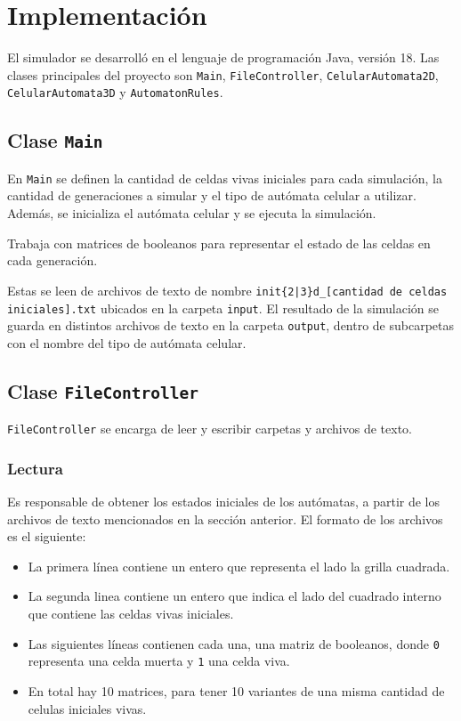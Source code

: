 \section{Implementación}
\label{sec:implementacion}

El simulador se desarrolló en el lenguaje de programación Java, versión 18.
Las clases principales del proyecto son \texttt{Main}, \texttt{FileController}, \texttt{CelularAutomata2D}, \texttt{CelularAutomata3D} y \texttt{AutomatonRules}.

\subsection{Clase \texttt{Main}}
\label{subsec:main}
En \texttt{Main} se definen la cantidad de celdas vivas iniciales para cada simulación, la cantidad de generaciones a simular y el tipo de autómata celular a utilizar.
Además, se inicializa el autómata celular y se ejecuta la simulación.

Trabaja con matrices de booleanos para representar el estado de las celdas en cada generación.

Estas se leen de archivos de texto de nombre \texttt{init\{2|3\}d\_[cantidad de celdas iniciales].txt} ubicados en la carpeta \texttt{input}.
El resultado de la simulación se guarda en distintos archivos de texto en la carpeta \texttt{output}, dentro de subcarpetas con el nombre del tipo de autómata celular.

\subsection{Clase \texttt{FileController}}
\label{subsec:filecontroller}
\texttt{FileController} se encarga de leer y escribir carpetas y archivos de texto.

\subsubsection{Lectura}
\label{subsubsec:lectura}
Es responsable de obtener los estados iniciales de los autómatas, a partir de los archivos de texto mencionados en la sección anterior.
El formato de los archivos es el siguiente:
\begin{itemize}
    \item La primera línea contiene un entero que representa el lado la grilla cuadrada.
    \item La segunda linea contiene un entero que indica el lado del cuadrado interno que contiene las celdas vivas iniciales.
    \item Las siguientes líneas contienen cada una, una matriz de booleanos, donde \texttt{0} representa una celda muerta y \texttt{1} una celda viva.
    \item En total hay 10 matrices, para tener 10 variantes de una misma cantidad de celulas iniciales vivas.
\end{itemize}

